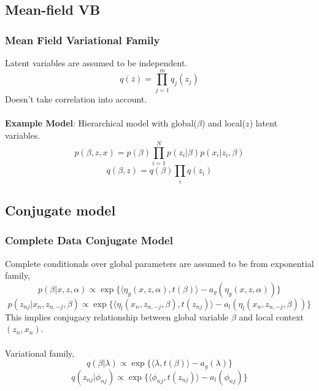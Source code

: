 \documentclass{beamer}
\begin{document}
\subsection{Mean-field VB}
\begin{frame}
\frametitle{Mean Field Variational Family}

Latent variables are assumed to be independent.
\[
q(\overline{z})=\prod_{j=1}^{m}q_j(z_j)
\]
Doesn't take correlation into account. \\~\\
\textbf{Example Model}: Hierarchical model with global(\(\beta\)) and local(\(z\)) latent variables.
\[
p(\beta,z,x)=p(\beta)\prod_{i=1}^{N}p(z_i|\beta)p(x_i|z_i,\beta)
\]
\[
q(\beta,z)=q(\beta)\prod_i q(z_i)
\]

\end{frame}

\subsection{Conjugate model}
\begin{frame}
\frametitle{Complete Data Conjugate Model}
Complete conditionals over global parameters are assumed to be from exponential family,
\[
p(\beta|x,z,\alpha) \propto \exp\{\langle\eta_g(x,z,\alpha),t(\beta)\rangle -a_g(\eta_g(x,z,\alpha))\}
\]
\[
p(z_{nj}|x_n,z_{n,-j},\beta) \propto \exp\{\langle\eta_l(x_n,z_{n,-j},\beta),t(z_{nj})\rangle-a_l(\eta_l(x_n,z_{n,-j},\beta))\}
\]
This implies conjugacy relationship between global variable $\beta$ and local context $(z_n,x_n)$.\\~\\
Variational family,
\[
q(\beta|\lambda) \propto \exp\{\langle\lambda,t(\beta)\rangle-a_g(\lambda)\}
\]
\[
q(z_{nj}|\phi_{nj}) \propto \exp\{\langle\phi_{nj},t(z_{nj})\rangle-a_l(\phi_{nj})\}
\]
\end{frame}

\end{document}
